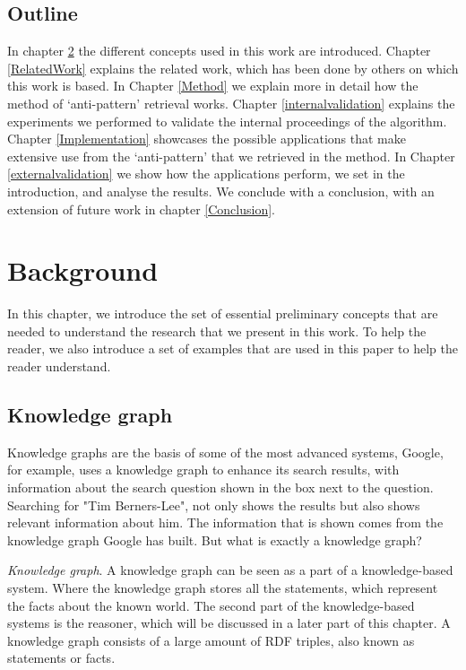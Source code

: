\documentclass[11pt,letterpaper ,oneside ]{book}
\begin{document}
	\section{Outline}
	In chapter \ref{Background} the different concepts used in this work are introduced. Chapter \ref{RelatedWork} explains the related work, which has been done by others on which this work is based.
	In Chapter \ref{Method} we explain more in detail how the method of `anti-pattern' retrieval works. Chapter \ref{internalvalidation} explains the experiments we performed to validate the internal proceedings of the algorithm. Chapter \ref{Implementation} showcases the possible applications that make extensive use from the `anti-pattern' that we retrieved in the method. In Chapter \ref{externalvalidation} we show how the applications perform, we set in the introduction, and analyse the results. We conclude with a conclusion, with an extension of future work in chapter \ref{Conclusion}.
	
	
	
	\newpage
	\chapter{Background}\label{Background}
	In this chapter, we introduce the set of essential preliminary concepts that are needed to understand the research that we present in this work. To help the reader, we also introduce a set of examples that are used in this paper to help the reader understand.
	
	\section{Knowledge graph}\label{graphElements}
	Knowledge graphs are the basis of some of the most advanced systems, Google, for example, uses a knowledge graph to enhance its search results, with information about the search question shown in the box next to the question. Searching for "Tim Berners-Lee", not only shows the results but also shows relevant information about him. The information that is shown comes from the knowledge graph Google has built. But what is exactly a knowledge graph?
	
	\textit{Knowledge graph}. 
	A knowledge graph can be seen as a part of a knowledge-based system. Where the knowledge graph stores all the statements, which represent the facts about the known world. The second part of the knowledge-based systems is the reasoner, which will be discussed in a later part of this chapter. A knowledge graph consists of a large amount of RDF triples, also known as statements or facts.
	
\end{document}
